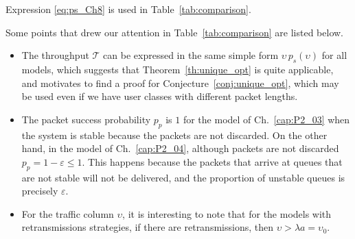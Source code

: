 Expression \eqref{eq:ps_Ch8} is used in Table~\ref{tab:comparison}.

\vspace{5mm}
Some points that drew our attention in Table~\ref{tab:comparison} are listed below.
\begin{itemize}
    \item The throughput $\mathscr{T}$ can be expressed in the same simple form $\upsilon\,p_s(\upsilon)$ for all models, which suggests that Theorem~\ref{th:unique_opt} is quite applicable, and motivates to find a proof for Conjecture~\ref{conj:unique_opt}, which may be used even if we have user classes with different packet lengths.
    
    \item The packet success probability $p_p$ is $1$ for the model of Ch.~\ref{cap:P2_03} when the system is stable because the packets are not discarded. On the other hand, in the model of Ch.~\ref{cap:P2_04}, although packets are not discarded $p_p = 1-\varepsilon\le 1$. This happens because the packets that arrive at queues that are not stable will not be delivered, and the proportion of unstable queues is precisely $\varepsilon$.
    
    \item For the traffic column $\upsilon$, it is interesting to note that for the models with retransmissions strategies, if there are retransmissions, then $\upsilon > \lambda a = \upsilon_0$.
\end{itemize}

